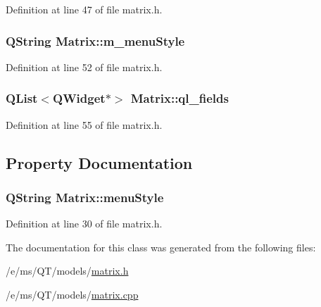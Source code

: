 Definition at line 47 of file matrix.h.

\hypertarget{classMatrix_a38be86e653e4899e473e15d5b26f7ec5}{
\subsubsection[{m\_\-menuStyle}]{\setlength{\rightskip}{0pt plus 5cm}QString {\bf Matrix::m\_\-menuStyle}}}
\label{classMatrix_a38be86e653e4899e473e15d5b26f7ec5}


Definition at line 52 of file matrix.h.

\hypertarget{classMatrix_a4b4d1b9d677922817b0b5ec66a40bbf0}{
\subsubsection[{ql\_\-fields}]{\setlength{\rightskip}{0pt plus 5cm}QList$<$QWidget$\ast$$>$ {\bf Matrix::ql\_\-fields}}}
\label{classMatrix_a4b4d1b9d677922817b0b5ec66a40bbf0}


Definition at line 55 of file matrix.h.



\subsection{Property Documentation}
\hypertarget{classMatrix_a047dfe13d0d463c8f4d206ad6bf80d91}{
\subsubsection[{menuStyle}]{\setlength{\rightskip}{0pt plus 5cm}QString Matrix::menuStyle}}
\label{classMatrix_a047dfe13d0d463c8f4d206ad6bf80d91}


Definition at line 30 of file matrix.h.



The documentation for this class was generated from the following files:\begin{DoxyCompactItemize}
\item 
/e/ms/QT/models/\hyperlink{matrix_8h}{matrix.h}\item 
/e/ms/QT/models/\hyperlink{matrix_8cpp}{matrix.cpp}\end{DoxyCompactItemize}
